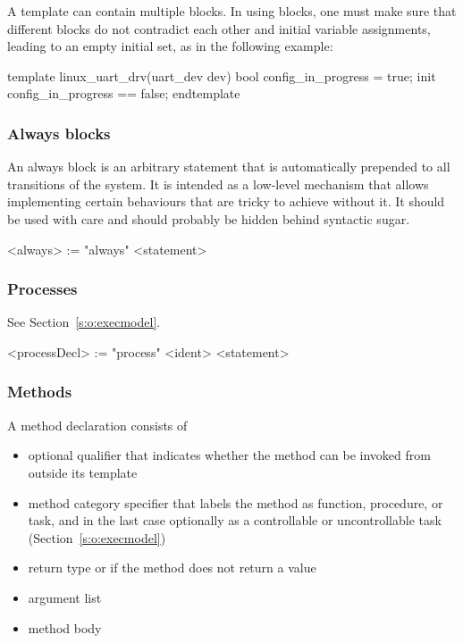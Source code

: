 A template can contain multiple  blocks.  In using 
 blocks, one must make sure that different  
blocks do not contradict each other and initial variable 
assignments, leading to an empty initial set, as in the following 
example:
\begin{tsllisting2}
template linux_uart_drv(uart_dev dev)
    bool config_in_progress = true;
    init config_in_progress == false;
endtemplate
\end{tsllisting2}

\subsubsection{Always blocks}\label{s:r:always}

An always block is an arbitrary statement that is automatically 
prepended to all transitions of the system.  It is intended as a 
low-level mechanism that allows implementing certain behaviours 
that are tricky to achieve without it.  It should be used with 
care and should probably be hidden behind syntactic sugar.

\begin{bnflisting}
<always> := "always" <statement>
\end{bnflisting}

\subsubsection{Processes}

See Section~\ref{s:o:execmodel}.

\begin{bnflisting}
<processDecl> := "process" <ident> <statement>
\end{bnflisting}

\subsubsection{Methods}\label{s:r:method}

A method declaration consists of
\begin{itemize}
    \item optional  qualifier that indicates whether 
        the method can be invoked from outside its template
    \item method category specifier that labels the method as 
        function, procedure, or task, and in the last case 
        optionally as a controllable or uncontrollable task 
        (Section~\ref{s:o:execmodel})
    \item return type or  if the method does not return 
        a value
    \item argument list
    \item method body
\end{itemize}

